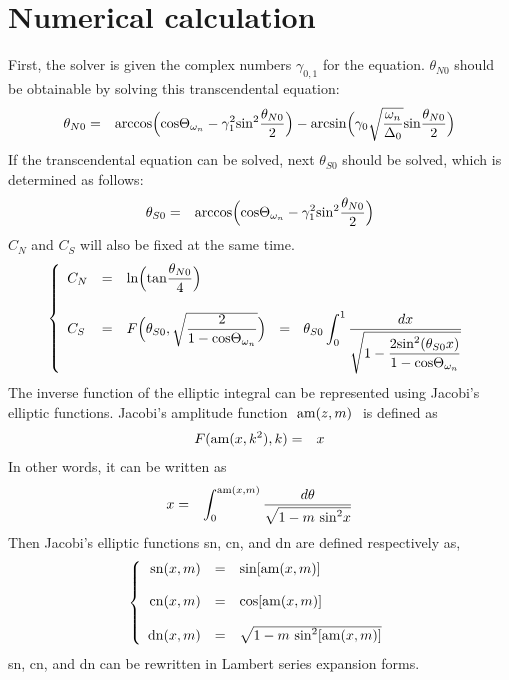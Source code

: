 \documentclass[uplatex,a4j,12pt,dvipdfmx]{jsarticle}
\begin{document}
\section{Numerical calculation}

First,
the solver is given the complex numbers $\gamma_{0,1}$ for the equation.
$\theta_{N0}$ should be obtainable by solving this transcendental equation:
\begin{eqnarray}
	\theta_{N0}
	&=&
	{\rm arccos}
	\Big( {\rm cos} \Theta_{\omega_{n}} - \gamma_{1}^{2} {\rm sin}^{2} \dfrac{\theta_{N0}}{2} \Big)
	-
	{\rm arcsin}
	\Big( \gamma_{0} \sqrt{ \dfrac{\omega_{n}}{\Delta_{0}} } {\rm sin} \dfrac{\theta_{N0}}{2} \Big)
	\label{eqn:theta_N0}
\end{eqnarray}
If the transcendental equation can be solved,
next $\theta_{S0}$ should be solved, which is determined as follows:
\begin{eqnarray}
	\theta_{S0}
	&=&
	{\rm arccos}
	\Big( {\rm cos} \Theta_{\omega_{n}} - \gamma_{1}^{2} {\rm sin}^{2} \dfrac{\theta_{N0}}{2} \Big)
\end{eqnarray}
$C_{N}$ and $C_{S}$ will also be fixed at the same time.
\begin{eqnarray}
	\left\{
	\begin{array}{lcl}
		C_{N}
		 & = &
		{\rm ln} \Big( {\rm tan} \dfrac{\theta_{N0}}{4} \Big)
		\\[6mm]
		C_{S}
		 & = &
		F \Big(\theta_{S0} , \sqrt{ \dfrac{2}{ 1 - {\rm cos} \Theta_{\omega_{n}} } } \Big)
		\ \ = \ \
		\displaystyle
		\theta_{S0}
		\int^{1}_{0} \dfrac{d x}{ \sqrt{1 - \dfrac{2 {\rm sin}^{2}(\theta_{S0} x) }{ 1 - {\rm cos} \Theta_{\omega_{n}} } }}
	\end{array}
	\right.
\end{eqnarray}
The inverse function of the elliptic integral can be represented
using Jacobi's elliptic functions.
Jacobi's amplitude function $\ {\rm am}(z,m) \ $ is defined as
\begin{eqnarray}
	F({\rm am}(x,k^{2}),k)
	&=&
	x
\end{eqnarray}
In other words, it can be written as
\begin{eqnarray}
	x
	&=&
	\int^{{\rm am}(x,m)}_{0} \dfrac{d \theta}{ \sqrt{1 - m \ {\rm sin}^{2}x}}
\end{eqnarray}
Then Jacobi's elliptic functions sn, cn, and dn are defined respectively as,
\begin{eqnarray}
	\left\{
	\begin{array}{rcl}
		{\rm sn} (x,m)
		 & = &
		{\rm sin} [{\rm am}(x,m)]
		\\[4mm]
		{\rm cn} (x,m)
		 & = &
		{\rm cos} [{\rm am}(x,m)]
		\\[4mm]
		{\rm dn} (x,m)
		 & = &
		\sqrt{1 - m \ {\rm sin}^{2} [{\rm am}(x,m)]}
	\end{array}
	\right.
\end{eqnarray}
sn, cn, and dn can be rewritten in Lambert series expansion forms.
\end{document}
